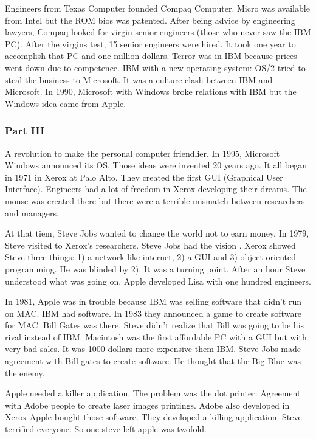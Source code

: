  Engineers from Texas Computer founded Compaq Computer. 
 Micro was available from Intel but the ROM bios was patented.
 After being advice by engineering lawyers, Compaq looked for virgin senior engineers 
 (those who never saw the IBM PC).  After the virgins test, 15 senior engineers were hired. 
 It took one year to accomplish that PC and one million dollars. 
 Terror was in IBM because prices went down due to competence.   
 IBM with a new operating system: OS/2 tried to steal the business to Microsoft. 
 It was a culture clash between IBM and Microsoft. 
 In 1990,  Microsoft with Windows broke 
 relations with IBM but the Windows idea came from Apple.   
   
  
            \subsubsection*{Part III} 
 A revolution to make the personal computer friendlier.  
 In 1995,  Microsoft Windows announced its OS. 
 Those ideas were invented 20 years ago. 
 It all began in 1971 in  Xerox at Palo Alto. 
 They created the first GUI (Graphical User Interface).
 Engineers had a lot of freedom in Xerox developing  their dreams. The mouse was 
 created there but there were a terrible mismatch between researchers and managers. 
 
 At that tiem, Steve Jobs wanted to change the world not to earn money.
 In 1979, Steve  visited to Xerox's researchers. 
 Steve Jobs had the vision . Xerox showed Steve three things: 1) a network like internet, 
 2) a GUI and  3) object oriented programming. He 
 was blinded by 2). It was a turning point. 
 After an hour Steve understood what was going on. 
 Apple developed Lisa with one hundred engineers. 
   
 In 1981, Apple was in trouble because IBM was selling software that didn't run on MAC. 
 IBM had software. In 1983 they announced a game to 
 create software for MAC. Bill Gates was there. 
 Steve didn't realize that Bill was going to be his rival instead of IBM. 
 Macintosh was the first 
 affordable PC with a GUI but with  very bad sales. 
 It was 1000 dollars more expensive them IBM.  
 Steve Jobs made agreement with Bill gates to create software. 
 He thought that the Big Blue was the enemy. 
   
   
 Apple needed a killer application. 
 The problem was the dot printer. Agreement with Adobe people to create laser images printings. 
 Adobe also developed in Xerox 
 Apple bought those software.
 They developed a killing application. 
 Steve terrified everyone. 
 So one steve left apple was twofold. 
   
